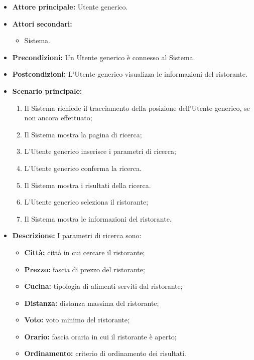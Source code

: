 \label{usecase:Visualizzazione di un ristorante}
\begin{itemize}
	\item \textbf{Attore principale:} Utente generico.

	\item \textbf{Attori secondari:}
	      \begin{itemize}
		      \item Sistema.
	      \end{itemize}

	\item \textbf{Precondizioni:}
	      Un Utente generico è connesso al Sistema.

	\item \textbf{Postcondizioni:}
	      L'Utente generico visualizza le informazioni del ristorante.

	\item \textbf{Scenario principale:}
	      \begin{enumerate}
		      \item Il Sistema richiede il tracciamento della posizione
		            dell'Utente generico, se non ancora effettuato;

		      \item Il Sistema mostra la pagina di ricerca;
		      \item L'Utente generico inserisce i parametri di ricerca;
		      \item L'Utente generico conferma la ricerca.
		      \item Il Sistema mostra i risultati della ricerca.
		      \item L'Utente generico seleziona il ristorante;
		      \item Il Sistema mostra le informazioni del ristorante.
	      \end{enumerate}

	\item \textbf{Descrizione:}
	      I parametri di ricerca sono:
	      \begin{itemize}
		      \item \textbf{Città:} città in cui cercare il ristorante;
		      \item \textbf{Prezzo:} fascia di prezzo del ristorante;
		      \item \textbf{Cucina:} tipologia di alimenti serviti dal ristorante;
		      \item \textbf{Distanza:} distanza massima del ristorante;
		      \item \textbf{Voto:} voto minimo del ristorante;
		      \item \textbf{Orario:} fascia oraria in cui il ristorante è aperto;
		      \item \textbf{Ordinamento:} criterio di ordinamento dei risultati.
	      \end{itemize}
\end{itemize}
